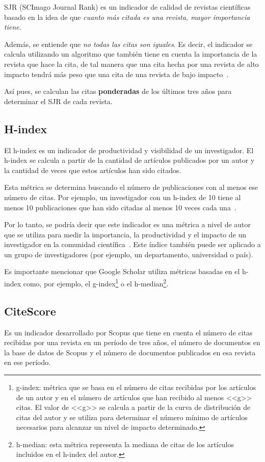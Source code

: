 SJR (SCImago Journal Rank) es un indicador de calidad de revistas científicas basado en la idea de que \textit{cuanto más citada es una revista, mayor importancia tiene}. 

Además, se entiende que \textit{no todas las citas son iguales}\cite{Svetla2022}. Es decir, el indicador se calcula utilizando un algoritmo que también tiene en cuenta la importancia de la revista que hace la cita, de tal manera que una cita hecha por una revista de alto impacto tendrá más peso que una cita de una revista de bajo impacto~\cite{Svetla2022}. 

Así pues, se calculan las citas \textbf{ponderadas} de los últimos tres años para determinar el SJR de cada revista.

\subsection{H-index}
El h-index es un indicador de productividad y visibilidad de un investigador. El h-index se calcula a partir de la cantidad de artículos publicados por un autor y la cantidad de veces que estos artículos han sido citados. 

Esta métrica se determina buscando el número de publicaciones con al menos ese número de citas. Por ejemplo, un investigador con un h-index de 10 tiene al menos 10 publicaciones que han sido citadas al menos 10 veces cada una~\cite{Svetla2022}. 

Por lo tanto, se podría decir que este indicador es una métrica a nivel de autor que se utiliza para medir la importancia, la productividad y el impacto de un investigador en la comunidad científica~\cite{Svetla2022}. Este índice también puede ser aplicado a un grupo de investigadores (por ejemplo, un departamento, universidad o país).

Es importante mencionar que Google Scholar utiliza métricas basadas en el h-index como, por ejemplo, el g-index\footnote{g-index: métrica que se basa en el número de citas recibidas por los artículos de un autor y en el número de artículos que han recibido al menos <<g>> citas. El valor de <<g>> se calcula a partir de la curva de distribución de citas del autor y se utiliza para determinar el número mínimo de artículos necesarios para alcanzar un nivel de impacto determinado.} o el h-median\footnote{h-median: esta métrica representa la mediana de citas de los artículos incluidos en el h-index del autor.}.

\subsection{CiteScore}
Es un indicador desarrollado por Scopus que tiene en cuenta el número de citas recibidas por una revista en un período de tres años, el número de documentos en la base de datos de Scopus y el número de documentos publicados en esa revista en ese período.

